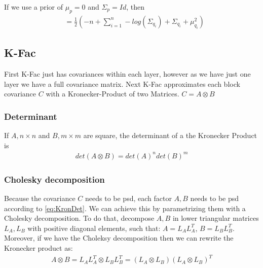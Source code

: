 \documentclass[a4paper]{scrartcl}
\begin{document}
      If we use a prior of $\mu_p=0$ and $\Sigma_p=Id$, then
      \begin{align}
          &= \frac{1}{2} (- n + \sum_{i=1}^n - log(\Sigma_{q_i}) + \Sigma_{q_i} +  \mu_{q_i}^2)
      \end{align}
          

  \subsection{K-Fac}
      First K-Fac just has covariances within each layer, however as we have
      just one layer we have a full covariance matrix.
      Next K-Fac approximates each block covariance $C$ with a Kronecker-Product of two Matrices.
      $C= A \otimes B$

      \subsubsection{Determinant}
        If $A, n\times n$ and $B, m \times m$ are square, the determinant of a the Kronecker Product is
        \begin{align}\label{eq:KronDet}
          det(A \otimes B) = det(A)^n det(B)^m
        \end{align}
        
      \subsubsection{Cholesky decomposition}
        Because the covariance $C$ needs to be psd, each factor $A,B$ needs to be
        psd according to \ref{eq:KronDet}. We can achieve this by parametrizing them with a Cholesky
        decomposition. To do that, decompose $A,B$ in lower triangular matrices
        $L_A, L_B$ with positive diagonal elements, such that: $A=L_AL_A^T$,
        $B=L_BL_B^T$.
        Moreover, if we have the Choleksy decomposition then we can rewrite the Kronecker product as:
        \begin{align}\label{eq:CholKron}
          A \otimes B = L_AL_A^T \otimes L_BL_B^T = (L_A \otimes L_B) (L_A \otimes L_B)^T
        \end{align}
        
\end{document}
